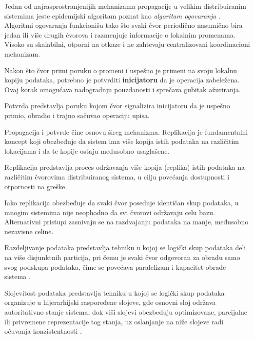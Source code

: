 Jedan od najrasprostranjenijih mehanizama propagacije u velikim distribuiranim sistemima jeste epidemijski algoritam poznat kao \textit{algoritam ogovaranja} . Algoritmi ogovaranja funkcionišu tako što svaki čvor periodično nasumično bira jedan ili više drugih čvorova i razmenjuje informacije o lokalnim promenama. Visoko su skalabilni, otporni na otkaze i ne zahtevaju centralizovani koordinacioni mehanizam.

Nakon što čvor primi poruku o promeni i uspešno je primeni na svoju lokalnu kopiju podataka, potrebno je potvrditi \textbf{inicijatoru} da je operacija zabeležena. Ovaj korak omogućava nadogradnju pouzdanosti i sprečava gubitak ažuriranja.

\begin{definicija}
Potvrda  predstavlja poruku kojom čvor signalizira inicijatoru da je uspešno primio, obradio i trajno sačuvao operaciju upisa.
\end{definicija}

Propagacija i potvrde čine osnovu šireg mehanizma. Replikacija \cite{gray1996dangers} je fundamentalni koncept koji obezbeđuje da sistem ima više kopija istih podataka na različitim lokacijama i da te kopije ostaju međusobno usaglašene.

\begin{definicija}\label{def:replikacija}
Replikacija predstavlja proces održavanja više kopija (replika) istih podataka na različitim čvorovima distribuiranog sistema, u cilju povećanja dostupnosti i otpornosti na greške.
\end{definicija}

Iako replikacija obezbeđuje da svaki čvor poseduje identičan skup podataka, u mnogim sistemima nije neophodno da svi čvorovi održavaju celu bazu. Alternativni pristupi zasnivaju se na razdvajanju podataka na manje, međusobno nezavisne celine.

\begin{definicija}\label{def:sharding}
Razdeljivanje podataka  predstavlja tehniku u kojoj se logički skup podataka deli na više disjunktnih particija, pri čemu je svaki čvor odgovoran za obradu samo svog podskupa podataka, čime se povećava paralelizam i kapacitet obrade sistema \cite{curino2010schism}.
\end{definicija}

\begin{definicija}\label{def:layering}
Slojevitost podataka  predstavlja tehniku u kojoj se logički skup podataka organizuje u hijerarhijski raspoređene slojeve, gde osnovni sloj  održava autoritativno stanje sistema, dok viši slojevi obezbeđuju optimizovane, parcijalne ili privremene reprezentacije tog stanja, uz oslanjanje na niže slojeve radi očuvanja konzistentnosti \cite{lu2009hierarchical}.
\end{definicija}

